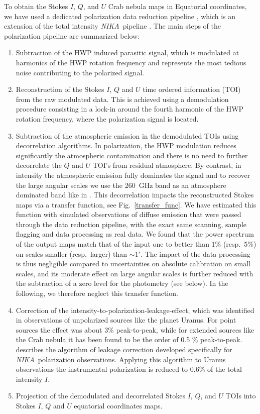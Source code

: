 \documentclass[twocolumn,traditabstract]{aa}
\def\NIKA{\textit{NIKA}}
\begin{document}
To obtain the Stokes $I$, $Q$, and $U$ Crab nebula maps in Equatorial coordinates, we have used a dedicated
polarization data reduction pipeline \citep{ritacco2017}, which is an extension
of the total intensity \NIKA\ pipeline \citep{catalano2014,adam2013}. The main steps
of the polarization pipeline are summarized below:
\begin{enumerate}
\item Subtraction of the HWP induced parasitic signal, which is modulated at harmonics of the HWP rotation frequency and represents the most tedious noise contributing to the polarized signal. 
\item Reconstruction of the Stokes $I$, $Q$ and $U$ time ordered information
  (TOI) from the raw modulated data. This is achieved using a demodulation
  procedure consisting in a lock-in around the fourth harmonic of the HWP rotation frequency, where the polarization signal is located.
\item Subtraction of the atmospheric emission in the demodulated TOIs using
  decorrelation algorithms. In polarization, the HWP modulation reduces
  significantly the atmospheric contamination and there is no need to
  further decorrelate the $Q$ and $U$ TOI's from residual atmosphere. By contrast, in
  intensity the atmospheric emission fully dominates the signal and to recover
  the large angular scales we use the 260~GHz band as an atmosphere
  dominated band like in \cite{adam2013}.  This decorrelation impacts the
  reconstructed Stokes maps via a transfer function, see Fig.~\ref{transfer_func}. We have estimated this function
  with simulated observations of diffuse emission that were passed through the
  data reduction pipeline, with the exact same scanning, sample flagging and data
  processing as real data. We found that the power spectrum of the output maps
  match that of the input one to better than 1\% (resp.~5\%) on scales smaller
  (resp.~larger) than $\sim 1'$. The impact of the data processing is thus
  negligible compared to uncertainties on absolute calibration on small
  scales, and its moderate effect on large angular scales is further reduced
  with the subtraction of a zero level for the photometry (see below). In the
  following, we therefore neglect this transfer function.


\item Correction of the intensity-to-polarization-leakage-effect, which was
  identified in observations of unpolarized sources like the planet Uranus. For
  point sources the effect was about 3\% peak-to-peak, while for extended sources like the Crab nebula it has been found to be the order of 0.5 \% peak-to-peak. 
  \cite{ritacco2017} describes the algorithm of leakage correction developed specifically for \NIKA\ polarization observations. Applying this algorithm to Uranus observations the instrumental polarization is reduced to 0.6\% of the total intensity $I$.
  \item Projection of the demodulated and decorrelated Stokes $I$, $Q$, and $U$ TOIs into Stokes $I$, $Q$ and $U$ equatorial coordinates maps.

\end{enumerate}
\end{document}
